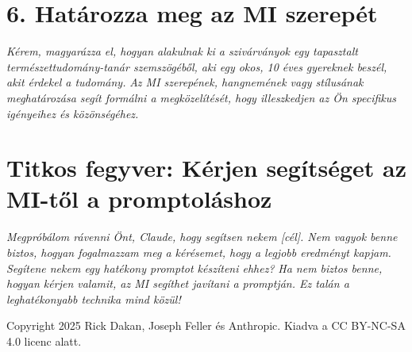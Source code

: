 \documentclass[a4paper, 11pt]{article}
\begin{document}
\section*{6. Határozza meg az MI szerepét}
\textit{Kérem, magyarázza el, hogyan alakulnak ki a szivárványok egy tapasztalt természettudomány-tanár szemszögéből, aki egy okos, 10 éves gyereknek beszél, akit érdekel a tudomány.}
\textit{Az MI szerepének, hangnemének vagy stílusának meghatározása segít formálni a megközelítését, hogy illeszkedjen az Ön specifikus igényeihez és közönségéhez.}

\section*{Titkos fegyver: Kérjen segítséget az MI-től a promptoláshoz}
\textit{Megpróbálom rávenni Önt, Claude, hogy segítsen nekem [cél]. Nem vagyok benne biztos, hogyan fogalmazzam meg a kérésemet, hogy a legjobb eredményt kapjam. Segítene nekem egy hatékony promptot készíteni ehhez?}
\textit{Ha nem biztos benne, hogyan kérjen valamit, az MI segíthet javítani a promptján. Ez talán a leghatékonyabb technika mind közül!}

\vspace{\fill}
\begin{center}
    \small{Copyright 2025 Rick Dakan, Joseph Feller és Anthropic. Kiadva a CC BY-NC-SA 4.0 licenc alatt.}
\end{center}
\end{document}
